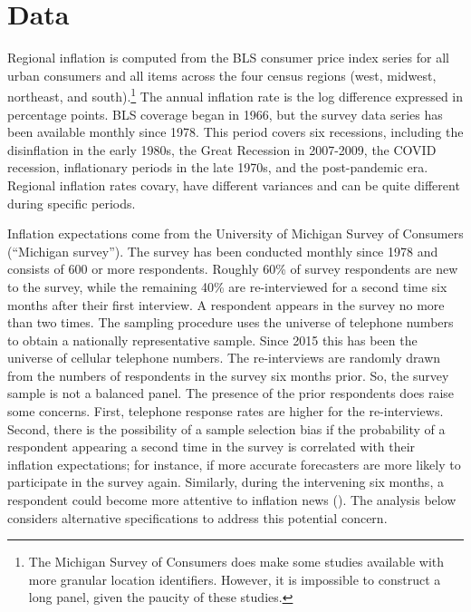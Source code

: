 \documentclass[12pt]{article}
\begin{document}
\section{Data}

Regional inflation is computed from the BLS consumer price index series for all urban consumers and all items across the four census regions (west, midwest, northeast, and south).\footnote{The Michigan Survey of Consumers does make some studies available with more granular location identifiers. However, it is impossible to construct a long panel, given the paucity of these studies.} The annual inflation rate is the log difference expressed in percentage points. BLS coverage began in 1966, but the survey data series has been available monthly since 1978. This period covers six recessions, including the disinflation in the early 1980s, the Great Recession in 2007-2009, the COVID recession, inflationary periods in the late 1970s, and the post-pandemic era. Regional inflation rates covary, have different variances and can be quite different during specific periods. 

Inflation expectations come from the University of Michigan Survey of Consumers (``Michigan survey''). The survey has been conducted monthly since 1978 and consists of 600 or more respondents. Roughly 60\% of survey respondents are new to the survey, while the remaining 40\% are re-interviewed for a second time six months after their first interview. A respondent appears in the survey no more than two times. The sampling procedure uses the universe of telephone numbers to obtain a nationally representative sample. Since 2015 this has been the universe of cellular telephone numbers. The re-interviews are randomly drawn from the numbers of respondents in the survey six months prior. So, the survey sample is not a balanced panel. The presence of the prior respondents does raise some concerns. First, telephone response rates are higher for the re-interviews. Second, there is the possibility of a sample selection bias if the probability of a respondent appearing a second time in the survey is correlated with their inflation expectations; for instance, if more accurate forecasters are more likely to participate in the survey again. Similarly, during the intervening six months, a respondent could become more attentive to inflation news (\cite{BinderKim:AEJM2021}). The analysis below considers alternative specifications to address this potential concern.
\end{document}
